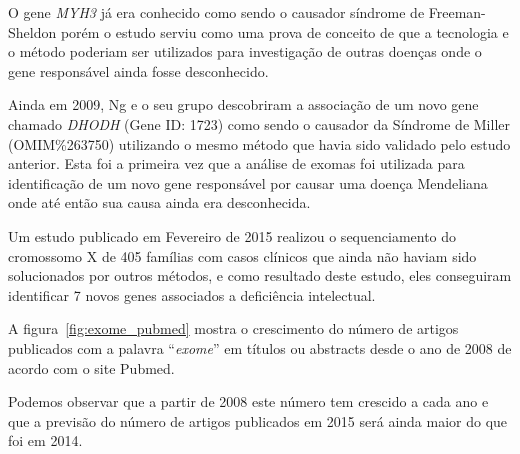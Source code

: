 
O gene \textit{MYH3} já era conhecido como sendo o causador síndrome de Freeman-Sheldon porém o estudo serviu como uma prova de conceito de que a tecnologia e o método poderiam ser utilizados para investigação de outras doenças onde o gene responsável ainda fosse desconhecido.

Ainda em 2009, Ng e o seu grupo \cite{Ng2010} descobriram a associação de um novo gene chamado \textit{DHODH} (Gene ID: 1723) como sendo o causador da Síndrome de Miller (OMIM\%263750) utilizando o mesmo método que havia sido validado pelo estudo anterior. Esta foi a primeira vez que a análise de exomas foi utilizada para identificação de um novo gene responsável por causar uma doença Mendeliana onde até então sua causa ainda era desconhecida.

Um estudo publicado em Fevereiro de 2015 \cite{Hu2015} realizou o sequenciamento do cromossomo X de 405 famílias com casos clínicos que ainda não haviam sido solucionados por outros métodos, e como resultado deste estudo, eles conseguiram identificar 7 novos genes associados a deficiência intelectual.

A figura~\ref{fig:exome_pubmed} mostra o crescimento do número de artigos publicados com a palavra ``\textit{exome}'' em títulos ou abstracts desde o ano de 2008 de acordo com o site Pubmed. 

Podemos observar que a partir de 2008 este número tem crescido a cada ano e que a previsão do número de artigos publicados em 2015 será ainda maior do que foi em 2014.

